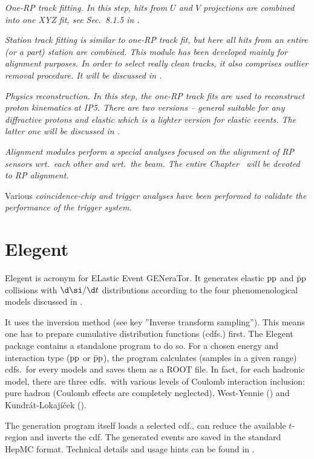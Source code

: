 \em{One-RP track fitting}.
In this step, hits from $U$ and $V$ projections are combined into one XYZ fit, see Sec.~8.1.5 in .

\em{Station track fitting} is similar to one-RP track fit, but here all hits from an entire (or a part) station are combined. This module has been developed mainly for alignment purposes. In order to select really clean tracks, it also comprises outlier removal procedure. It will be discussed in .

\em{Physics reconstruction}.
In this step, the one-RP track fits are used to reconstruct proton kinematics at IP5. There are two versions -- \em{general} suitable for any diffractive protons and \em{elastic} which is a lighter version for elastic events. The latter one will be discussed in .

\em{Alignment} modules perform a special analyses focused on the alignment of RP sensors wrt.~each other and wrt.~the beam. The entire Chapter~ will be devoted to RP alignment. 

Various \em{coincidence-chip and trigger analyses} have been performed to validate the performance of the trigger system.

\section[elegent]{Elegent}

Elegent is acronym for ELastic Event GENeraTor. It generates elastic $\rm pp$ and $\rm\bar pp$ collisions with $\d\si/\d t$ distributions according to the four phenomenological models discussed in .

It uses the inversion method (see  key ''Inverse transform sampling''). This means one has to prepare cumulative distribution functions (cdfs.) first. The Elegent package contains a standalone program to do so. For a chosen energy and interaction type ($\rm pp$ or $\rm\bar pp$), the program calculates (samples in a given range) cdfs.~for every models and saves them as a ROOT file. In fact, for each hadronic model, there are three cdfs.~with various levels of Coulomb interaction inclusion: pure hadron (Coulomb effects are completely neglected), West-Yennie () and Kundr\' at-Lokaj\' i\v cek ().

The generation program itself loads a selected cdf., can reduce the available $t$-region and inverts the cdf. The generated events are saved in the standard HepMC  format. Technical details and usage hints can be found in .


